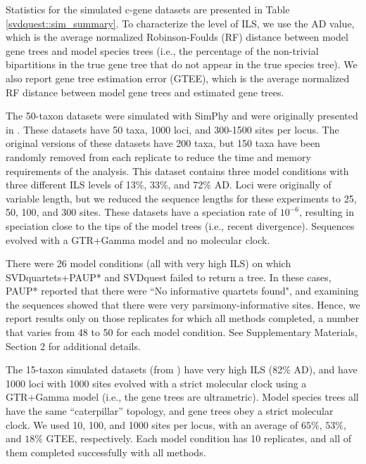 Statistics for the simulated c-gene datasets are presented in Table
\ref{svdquest::sim_summary}. To characterize the level of ILS, we use the AD value,
which is the average normalized Robinson-Foulds (RF) distance
\cite{robinson1981comparison} between model gene trees and model
species trees (i.e., the percentage of the non-trivial bipartitions in
the true gene tree that do not appear in the true species tree).  We
also report gene tree estimation error (GTEE), which is the average
normalized RF distance between model gene trees
and estimated gene trees.


The 50-taxon datasets were simulated with SimPhy \cite{SimPhy} and
were originally presented in \cite{mirarab2015astral}. These datasets
have 50 taxa, 1000 loci, and 300-1500 sites per locus. The original
versions of these datasets have 200 taxa, but 150 taxa have been
randomly removed from each replicate to reduce the time and memory
requirements of the analysis. This dataset contains three model
conditions with three different ILS levels of 13\%, 33\%, and 72\%
AD. Loci were originally of variable length, but we reduced the sequence lengths for these experiments to 25, 50, 100, and 300 sites.
These datasets have a speciation rate of $10^{-6}$, resulting in speciation close to the tips of the model trees (i.e., recent divergence). 
Sequences evolved with a GTR+Gamma model and no molecular
clock.

{
There were 26 model conditions (all with very high ILS) on which SVDquartets+PAUP* and SVDquest failed to return a tree. In these cases, PAUP* reported that there were ``No informative quartets found", and examining the sequences showed that there were very parsimony-informative sites. 
Hence, we report results only on those replicates for which all methods completed, 
a number that varies from 48 to 50 for each model condition.
See  {Supplementary Materials, Section 2} for additional details.
}



The 15-taxon simulated datasets (from \cite{bayzid2015weighted}) have
very high ILS (82\% AD), and have 1000 loci with 1000 sites evolved
with a strict molecular clock using a GTR+Gamma model (i.e., the gene trees are
ultrametric).  
Model species
trees all have the same ``caterpillar'' topology, and gene trees obey
a strict molecular clock. We used 10, 100, and 1000 sites per locus,
with an average of $65\%$, $53\%$, and $18\%$ GTEE, respectively. 
Each
model condition has 10 replicates, and all of them completed
successfully with all methods.



